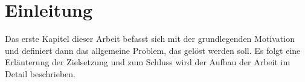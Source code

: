 \chapter{Einleitung}\label{ch:einleitung}

Das erste Kapitel dieser Arbeit befasst sich mit der grundlegenden Motivation und definiert dann das allgemeine Problem, das gelöst werden soll. Es folgt eine Erläuterung der Zielsetzung und zum Schluss
wird der Aufbau der Arbeit im Detail beschrieben.





